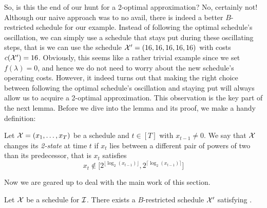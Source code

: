 So, is this the end of our hunt for a 2-optimal approximation? No, certainly not! Although our naive approach was to no avail, there is indeed a better $B$-restricted schedule for our example. Instead of following the optimal schedule's oscillation, we can simply use a schedule that stays put during these oscillating steps, that is we can use the schedule $\mathcal{X}'=(16,16,16,16,16)$ with costs $c(\mathcal{X}')=16$. Obviously, this seems like a rather trivial example since we set $f(\lambda)=0$, and hence we do not need to worry about the new schedule's operating costs. However, it indeed turns out that making the right choice between following the optimal schedule's oscillation and staying put will always allow us to acquire a 2-optimal approximation. This observation is the key part of the next lemma. Before we dive into the lemma and its proof, we make a handy definition:
\begin{defn}
Let $\mathcal{X}=(x_1,\dotsc,x_T)$ be a schedule and $t\in[T]$ with $x_{t-1}\neq 0$. We say that $\mathcal{X}$ changes its \emph{2-state} at time $t$ if $x_t$ lies between a different pair of powers of two than its predecessor, that is $x_t$ satisfies
\begin{equation*}
	x_t\notin\bigl[2^{\lfloor \log_2(x_{t-1})\rfloor},2^{\lceil \log_2(x_{t-1})\rceil}\bigr]
\end{equation*}
\end{defn}
Now we are geared up to deal with the main work of this section.
\begin{lem}\label{lem:transform_schedule_approx_2}
Let $\mathcal{X}$ be a schedule for $\mathcal{I}$. There exists a $B$-restricted schedule $\mathcal{X}'$ satisfying .
\end{lem}
